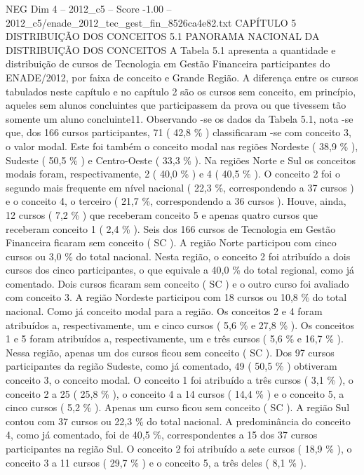 \begin{textsample}{NEG Dim 4 – 2012\_c5 – Score -1.00 – 2012\_c5/enade\_2012\_tec\_gest\_fin\_8526ca4e82.txt}  \label{ex:f4_neg_105}
CAPÍTULO 5 DISTRIBUIÇÃO DOS CONCEITOS 5.1 PANORAMA NACIONAL DA DISTRIBUIÇÃO DOS CONCEITOS A Tabela 5.1 apresenta a quantidade e distribuição de cursos de Tecnologia em Gestão Financeira participantes do ENADE/2012, por faixa de conceito e Grande Região.
A diferença entre os cursos tabulados neste capítulo e no capítulo 2 são os cursos sem conceito, em princípio, aqueles sem alunos concluintes que participassem da prova ou que tivessem tão somente um aluno concluinte11.
Observando -se os dados da Tabela 5.1, nota -se que, dos 166 cursos participantes, 71 ( 42,8 \% ) classificaram -se com conceito 3, o valor modal.
Este foi também o conceito modal nas regiões Nordeste ( 38,9 \% ), Sudeste ( 50,5 \% ) e Centro-Oeste ( 33,3 \% ).
Na regiões Norte e Sul os conceitos modais foram, respectivamente, 2 ( 40,0 \% ) e 4 ( 40,5 \% ).
O conceito 2 foi o segundo mais frequente em nível nacional ( 22,3 \%, correspondendo a 37 cursos ) e o conceito 4, o terceiro ( 21,7 \%, correspondendo a 36 cursos ).
Houve, ainda, 12 cursos ( 7,2 \% ) que receberam conceito 5 e apenas quatro cursos que receberam conceito 1 ( 2,4 \% ).
Seis dos 166 cursos de Tecnologia em Gestão Financeira ficaram sem conceito ( SC ).
A região Norte participou com cinco cursos ou 3,0 \% do total nacional.
Nesta região, o conceito 2 foi atribuído a dois cursos dos cinco participantes, o que equivale a 40,0 \% do total regional, como já comentado.
Dois cursos ficaram sem conceito ( SC ) e o outro curso foi avaliado com conceito 3.
A região Nordeste participou com 18 cursos ou 10,8 \% do total nacional.
Como já conceito modal para a região.
Os conceitos 2 e 4 foram atribuídos a, respectivamente, um e cinco cursos ( 5,6 \% e 27,8 \% ).
Os conceitos 1 e 5 foram atribuídos a, respectivamente, um e três cursos ( 5,6 \% e 16,7 \% ).
Nessa região, apenas um dos cursos ficou sem conceito ( SC ).
Dos 97 cursos participantes da região Sudeste, como já comentado, 49 ( 50,5 \% ) obtiveram conceito 3, o conceito modal.
O conceito 1 foi atribuído a três cursos ( 3,1 \% ), o conceito 2 a 25 ( 25,8 \% ), o conceito 4 a 14 cursos ( 14,4 \% ) e o conceito 5, a cinco cursos ( 5,2 \% ).
Apenas um curso ficou sem conceito ( SC ).
A região Sul contou com 37 cursos ou 22,3 \% do total nacional.
A predominância do conceito 4, como já comentado, foi de 40,5 \%, correspondentes a 15 dos 37 cursos participantes na região Sul.
O conceito 2 foi atribuído a sete cursos ( 18,9 \% ), o conceito 3 a 11 cursos ( 29,7 \% ) e o conceito 5, a três deles ( 8,1 \% ).

\end{textsample}
